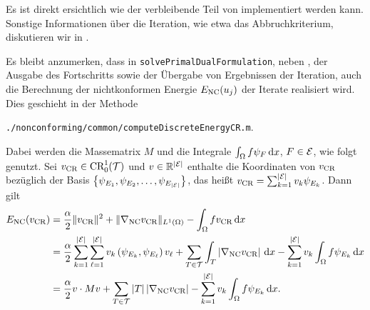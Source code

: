 Es ist direkt ersichtlich wie der verbleibende Teil von
 implementiert werden kann.
Sonstige Informationen über die Iteration, wie etwa das Abbruchkriterium,
diskutieren wir in .

Es bleibt anzumerken, dass in \texttt{solvePrimalDualFormulation}, neben 
, der Ausgabe des Fortschritts sowie
der Übergabe von Ergebnissen der Iteration, auch die Berechnung der
nichtkonformen Energie $E_\textup{NC}(u_j)$ der Iterate realisiert wird. 
Dies geschieht in der Methode
\begin{center}
  \texttt{./nonconforming/common/computeDiscreteEnergyCR.m}.
\end{center}
Dabei werden die Massematrix $M$ und die Integrale 
$\int_\Omega f\psi_{F}\,\mathrm{d}x$, $F\in\mathcal{E}$, wie folgt genutzt.
Sei $v_\textup{CR}\in\textup{CR}^1_0(\mathcal{T})$ und $v\in\mathbb{R}^{|\mathcal{E}|}$
enthalte die Koordinaten von $v_\textup{CR}$ bezüglich der Basis
$\left\{\psi_{E_1},\psi_{E_2},\ldots,\psi_{E_{|\mathcal{E}|}}\right\}$, das heißt
$v_\textup{CR}=\sum_{k=1}^{|\mathcal{E}|}v_k \psi_{E_k}$.
Dann gilt
\begin{align*}
  E_\textup{NC}(v_\textup{CR})
  &=
  \frac{\alpha}{2}\Vert v_\textup{CR}\Vert^2
  + \Vert\nabla_\textup{NC} v_\textup{CR}\Vert_{L^1(\Omega)}
  -\int_\Omega fv_\textup{CR}\,\mathrm{d}x\\
  &=
  \frac{\alpha}{2}
  \sum_{k=1}^{|\mathcal{E}|} 
  \sum_{\ell=1}^{|\mathcal{E}|} 
  v_k\left( \psi_{E_k}, \psi_{E_\ell} \right)v_\ell
  + \sum_{T\in\mathcal{T}}
   \int_T\left|\nabla_\textup{NC} v_\textup{CR}\right|\,\mathrm{d}x
  -\sum_{k=1}^{|\mathcal{E}|}v_k\int_\Omega f\psi_{E_k}\,\mathrm{d}x\\
  &=
  \frac{\alpha}{2} v\cdot Mv
  + \sum_{T\in\mathcal{T}}|T| \left|\nabla_\textup{NC} v_\textup{CR}\right|
  -\sum_{k=1}^{|\mathcal{E}|}v_k\int_\Omega f\psi_{E_k}\,\mathrm{d}x.
\end{align*}



%
%
%
%
%



